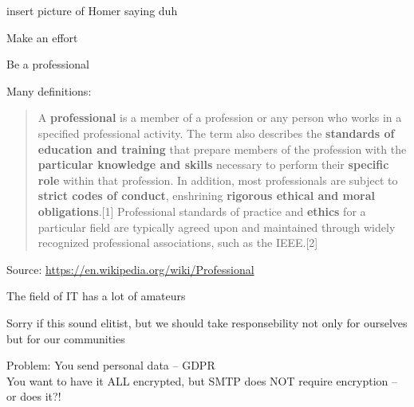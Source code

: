 \documentclass[Screen16to9,17pt]{foils}
\begin{document}

insert picture of Homer saying duh

\begin{quote}

\end{quote}

\begin{list2}
\item Make an effort
\item Be a professional
\end{list2}

Many definitions:
\begin{quote}
A {\bf professional} is a member of a profession or any person who works in a specified professional activity. The term also describes the {\bf standards of education and training} that prepare members of the profession with the {\bf particular knowledge and skills} necessary to perform their {\bf specific role} within that profession. In addition, most professionals are subject to {\bf strict codes of conduct}, enshrining {\bf rigorous ethical and moral obligations}.[1] Professional standards of practice and {\bf ethics} for a particular field are typically agreed upon and maintained through widely recognized professional associations, such as the IEEE.[2]
\end{quote}
Source: \url{https://en.wikipedia.org/wiki/Professional}

\begin{list2}
\item The field of IT has a lot of amateurs
\item Sorry if this sound elitist, but we should take responsebility not only for ourselves but for our communities
\end{list2}


Problem: You send personal data -- GDPR\\
You want to have it ALL encrypted, but SMTP does NOT require encryption -- or does it?!

\vskip 1cm
\end{document}
